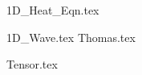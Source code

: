 \documentclass[a4paper, 12pt]{report}
\begin{document}
\begin{center}
{1D_Heat_Eqn.tex}
\begin{comment}
Start Level: Chapter
End Level: Chapter
Aditional Comments:
\end{comment}
{1D_Wave.tex}
{Thomas.tex}
\begin{comment}
Start Level: Chapter
End Level: Chapter
Aditional Comments:
\end{comment}
{Tensor.tex}
\begin{comment}
Start Level: Chapter
End Level: Chapter
Aditional Comments:
\end{comment}
\end{center}
\end{document}
